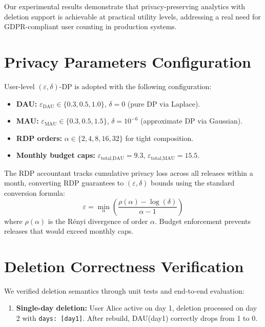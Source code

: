 \documentclass[11pt]{article}
\begin{document}
Our experimental results demonstrate that privacy-preserving analytics with deletion support is achievable at practical utility levels, addressing a real need for GDPR-compliant user counting in production systems.

\newpage
\begin{appendices}
\section{Privacy Parameters Configuration}
\label{appendix:privacy}

User-level $(\varepsilon, \delta)$-DP is adopted with the following configuration:

\begin{itemize}[leftmargin=*]
    \item \textbf{DAU:} $\varepsilon_{\text{DAU}} \in \{0.3, 0.5, 1.0\}$, $\delta = 0$ (pure DP via Laplace).
    \item \textbf{MAU:} $\varepsilon_{\text{MAU}} \in \{0.3, 0.5, 1.5\}$, $\delta = 10^{-6}$ (approximate DP via Gaussian).
    \item \textbf{RDP orders:} $\alpha \in \{2, 4, 8, 16, 32\}$ for tight composition.
    \item \textbf{Monthly budget caps:} $\varepsilon_{\text{total,DAU}} = 9.3$, $\varepsilon_{\text{total,MAU}} = 15.5$.
\end{itemize}

The RDP accountant tracks cumulative privacy loss across all releases within a month, converting RDP guarantees to $(\varepsilon, \delta)$ bounds using the standard conversion formula:
\[
\varepsilon = \min_{\alpha} \left( \frac{\rho(\alpha) - \log(\delta)}{\alpha - 1} \right)
\]
where $\rho(\alpha)$ is the Rényi divergence of order $\alpha$. Budget enforcement prevents releases that would exceed monthly caps.

\section{Deletion Correctness Verification}
\label{appendix:deletion}

We verified deletion semantics through unit tests and end-to-end evaluation:

\begin{enumerate}[leftmargin=*]
    \item \textbf{Single-day deletion:} User Alice active on day 1, deletion processed on day 2 with \texttt{days: [day1]}. After rebuild, DAU(day1) correctly drops from 1 to 0.
    

\end{enumerate}
\end{appendices}
\end{document}

